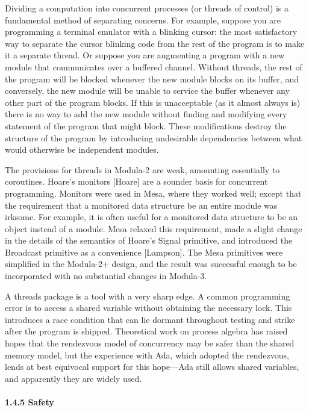 \documentclass[10pt]{article}
\begin{document}
Dividing a computation into concurrent processes (or threads of control) is a
fundamental method of separating concerns.  For example, suppose you are
programming a terminal emulator with a blinking cursor: the most satisfactory
way to separate the cursor blinking code from the rest of the program is to
make it a separate thread.  Or suppose you are augmenting a program with a new
module that communicates over a buffered channel.  Without threads, the rest of
the program will be blocked whenever the new module blocks on its buffer, and
conversely, the new module will be unable to service the buffer whenever any
other part of the program blocks.  If this is unacceptable (as it almost always
is) there is no way to add the new module without finding and modifying every
statement of the program that might block.  These modifications destroy the
structure of the program by introducing undesirable dependencies between what
would otherwise be independent modules.

The provisions for threads in Modula-2 are weak, amounting essentially to
coroutines.  Hoare's monitors [Hoare] are a sounder basis for concurrent
programming.  Monitors were used in Mesa, where they worked well; except that
the requirement that a monitored data structure be an entire module was
irksome.  For example, it is often useful for a monitored data structure to be
an object instead of a module.  Mesa relaxed this requirement, made a slight
change in the details of the semantics of Hoare's Signal primitive, and
introduced the Broadcast primitive as a convenience [Lampson].  The Mesa
primitives were simplified in the Modula-2+ design, and the result was
successful enough to be incorporated with no substantial changes in Modula-3.

A threads package is a tool with a very sharp edge.  A common programming error
is to access a shared variable without obtaining the necessary lock.  This
introduces a race condition that can lie dormant throughout testing and strike
after the program is shipped.  Theoretical work on process algebra has raised
hopes that the rendezvous model of concurrency may be safer than the shared
memory model, but the experience with Ada, which adopted the rendezvous, lends
at best equivocal support for this hope---Ada still allows shared variables,
and apparently they are widely used.

\paragraph{1.4.5 Safety}
\end{document}
